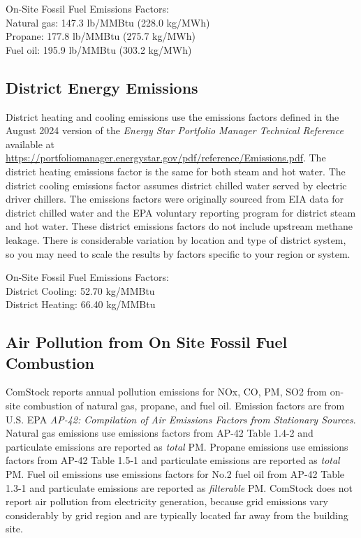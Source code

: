 On-Site Fossil Fuel Emissions Factors:\\
Natural gas: 147.3 lb/MMBtu (228.0 kg/MWh)\\
Propane: 177.8 lb/MMBtu (275.7 kg/MWh)\\
Fuel oil: 195.9 lb/MMBtu (303.2 kg/MWh)\\

\subsection{District Energy Emissions}
District heating and cooling emissions use the emissions factors defined in the August 2024 version of the \textit{Energy Star Portfolio Manager Technical Reference} available at \url{https://portfoliomanager.energystar.gov/pdf/reference/Emissions.pdf}. The district heating emissions factor is the same for both steam and hot water. The district cooling emissions factor assumes district chilled water served by electric driver chillers. The emissions factors were originally sourced from EIA data for district chilled water and the EPA voluntary reporting program for district steam and hot water. These district emissions factors do not include upstream methane leakage. There is considerable variation by location and type of district system, so you may need to scale the results by factors specific to your region or system.

On-Site Fossil Fuel Emissions Factors:\\
District Cooling: 52.70 kg/MMBtu\\
District Heating: 66.40 kg/MMBtu\\

\subsection{Air Pollution from On Site Fossil Fuel Combustion}
ComStock reports annual pollution emissions for NOx, CO, PM, SO2 from on-site combustion of natural gas, propane, and fuel oil. Emission factors are from U.S. EPA \textit{AP-42: Compilation of Air Emissions Factors from Stationary Sources}\citep{epa_ap42}. Natural gas emissions use emissions factors from AP-42 Table 1.4-2 and particulate emissions are reported as \textit{total} PM. Propane emissions use emissions factors from AP-42 Table 1.5-1 and particulate emissions are reported as \textit{total} PM. Fuel oil emissions use emissions factors for No.2 fuel oil from AP-42 Table 1.3-1 and particulate emissions are reported as \textit{filterable} PM.
ComStock does not report air pollution from electricity generation, because grid emissions vary considerably by grid region and are typically located far away from the building site.

